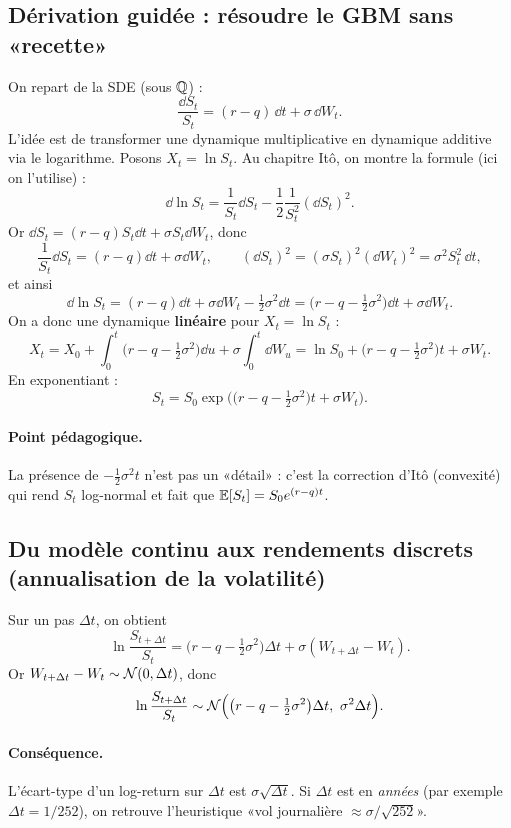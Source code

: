 
\subsection*{Dérivation guidée : résoudre le GBM sans «recette»}
On repart de la SDE (sous $\mathbb{Q}$) :
\[
\frac{\dd S_t}{S_t}=(r-q)\,\dd t+\sigma\,\dd W_t.
\]
L'idée est de transformer une dynamique multiplicative en dynamique additive via le logarithme.
Posons $X_t=\ln S_t$.
Au chapitre Itô, on montre la formule (ici on l'utilise) :
\[
\dd \ln S_t = \frac{1}{S_t}\dd S_t-\frac12\frac{1}{S_t^2}(\dd S_t)^2.
\]
Or $\dd S_t=(r-q)S_t\dd t+\sigma S_t\dd W_t$, donc
\[
\frac{1}{S_t}\dd S_t=(r-q)\dd t+\sigma \dd W_t,
\qquad
(\dd S_t)^2=(\sigma S_t)^2(\dd W_t)^2=\sigma^2 S_t^2\,\dd t,
\]
et ainsi
\[
\dd \ln S_t
=(r-q)\dd t+\sigma \dd W_t-\tfrac12\sigma^2\dd t
=\bigl(r-q-\tfrac12\sigma^2\bigr)\dd t+\sigma \dd W_t.
\]
On a donc une dynamique \textbf{linéaire} pour $X_t=\ln S_t$ :
\[
X_t=X_0+\int_0^t \bigl(r-q-\tfrac12\sigma^2\bigr)\dd u+\sigma\int_0^t \dd W_u
=\ln S_0+\bigl(r-q-\tfrac12\sigma^2\bigr)t+\sigma W_t.
\]
En exponentiant :
\[
\boxed{
S_t=S_0\exp\Big(\bigl(r-q-\tfrac12\sigma^2\bigr)t+\sigma W_t\Big).
}
\]
\paragraph{Point pédagogique.}
La présence de $-\tfrac12\sigma^2 t$ n'est pas un «détail» : c'est la correction d'Itô (convexité) qui rend $S_t$ log-normal et fait que $\mathbb{E}[S_t]=S_0e^{(r-q)t}$.

\subsection*{Du modèle continu aux rendements discrets (annualisation de la volatilité)}
Sur un pas $\Delta t$, on obtient
\[
\ln\frac{S_{t+\Delta t}}{S_t}
=\bigl(r-q-\tfrac12\sigma^2\bigr)\Delta t+\sigma (W_{t+\Delta t}-W_t).
\]
Or $W_{t+\Delta t}-W_t\sim\mathcal{N}(0,\Delta t)$, donc
\[
\ln\frac{S_{t+\Delta t}}{S_t}\sim
\mathcal{N}\Big(\bigl(r-q-\tfrac12\sigma^2\bigr)\Delta t,\ \sigma^2\Delta t\Big).
\]
\paragraph{Conséquence.}
L'écart-type d'un log-return sur $\Delta t$ est $\sigma\sqrt{\Delta t}$.
Si $\Delta t$ est en \emph{années} (par exemple $\Delta t=1/252$), on retrouve l'heuristique «vol journalière $\approx \sigma/\sqrt{252}$».

